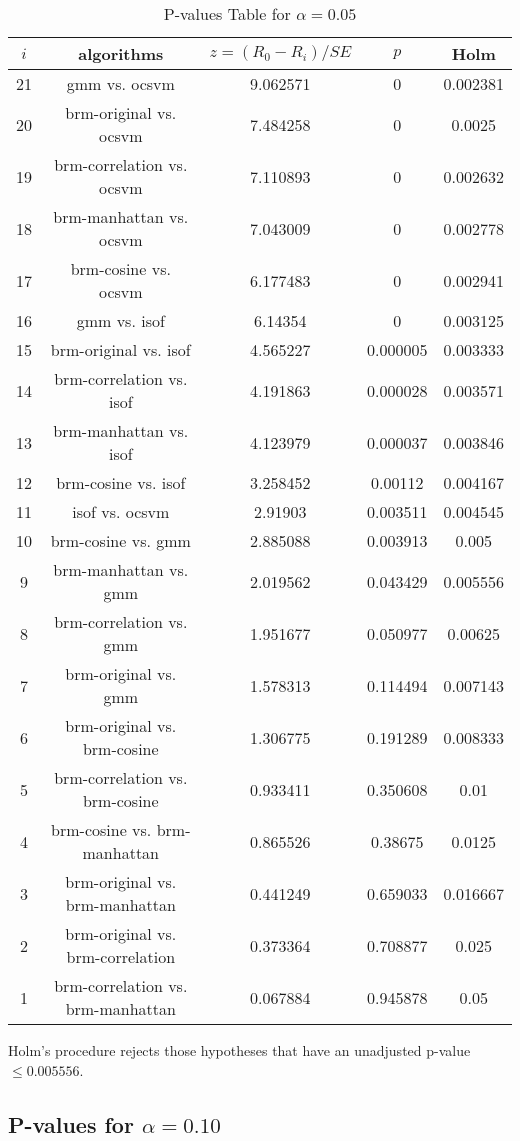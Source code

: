 \documentclass[a4paper,10pt]{article}
\begin{document}
\begin{landscape}
\begin{table}[!htp]
\centering\scriptsize
\begin{tabular}{ccccc}
$i$&algorithms&$z=(R_0 - R_i)/SE$&$p$&Holm\\
\hline21&gmm vs. ocsvm&9.062571&0&0.002381\\
20&brm-original vs. ocsvm&7.484258&0&0.0025\\
19&brm-correlation vs. ocsvm&7.110893&0&0.002632\\
18&brm-manhattan vs. ocsvm&7.043009&0&0.002778\\
17&brm-cosine vs. ocsvm&6.177483&0&0.002941\\
16&gmm vs. isof&6.14354&0&0.003125\\
15&brm-original vs. isof&4.565227&0.000005&0.003333\\
14&brm-correlation vs. isof&4.191863&0.000028&0.003571\\
13&brm-manhattan vs. isof&4.123979&0.000037&0.003846\\
12&brm-cosine vs. isof&3.258452&0.00112&0.004167\\
11&isof vs. ocsvm&2.91903&0.003511&0.004545\\
10&brm-cosine vs. gmm&2.885088&0.003913&0.005\\
9&brm-manhattan vs. gmm&2.019562&0.043429&0.005556\\
8&brm-correlation vs. gmm&1.951677&0.050977&0.00625\\
7&brm-original vs. gmm&1.578313&0.114494&0.007143\\
6&brm-original vs. brm-cosine&1.306775&0.191289&0.008333\\
5&brm-correlation vs. brm-cosine&0.933411&0.350608&0.01\\
4&brm-cosine vs. brm-manhattan&0.865526&0.38675&0.0125\\
3&brm-original vs. brm-manhattan&0.441249&0.659033&0.016667\\
2&brm-original vs. brm-correlation&0.373364&0.708877&0.025\\
1&brm-correlation vs. brm-manhattan&0.067884&0.945878&0.05\\
\hline
\end{tabular}
\caption{P-values Table for $\alpha=0.05$}
\end{table}Holm's procedure rejects those hypotheses that have an unadjusted p-value $\le0.005556$.

\pagebreak

\subsection{P-values for $\alpha=0.10$}


\end{landscape}
\end{document}
